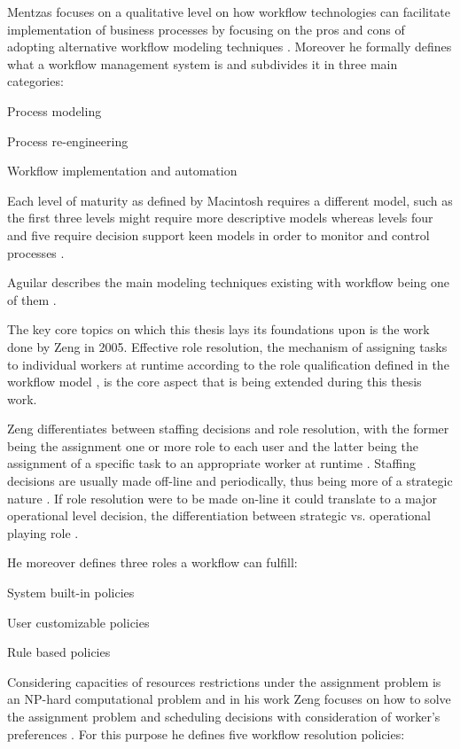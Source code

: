 \documentclass{seal_thesis}
\begin{document}
Mentzas focuses on a qualitative level on how workflow technologies can facilitate implementation of business processes by focusing on the pros and cons of adopting alternative workflow modeling techniques \cite{Mentzas2001}. Moreover he formally defines what a workflow management system is and subdivides it in three main categories:
\begin{enumerate*}
	\item Process modeling
	\item Process re-engineering
	\item Workflow implementation and automation
\end{enumerate*}

Each level of maturity as defined by Macintosh requires a different model, such as the first three levels might require more descriptive models whereas levels four and five require decision support keen models in order to monitor and control processes \cite{Mentzas2001}.

Aguilar describes the main modeling techniques existing with workflow being one of them \cite{Aguilar-Saven2004}.

The key core topics on which this thesis lays its foundations upon is the work done by Zeng in 2005. Effective role resolution, \ie the mechanism of assigning tasks to individual workers at runtime according to the role qualification defined in the workflow model \cite{Zeng2005}, is the core aspect that is being extended during this thesis work.

Zeng differentiates between staffing decisions and role resolution, with the former being the assignment one or more role to each user and the latter being the assignment of a specific task to an appropriate worker at runtime \cite{Zeng2005}. Staffing decisions are usually made off-line and periodically, thus being more of a strategic nature \cite{Zeng2005}. If role resolution were to be made on-line it could translate to a major operational level decision, \ie the differentiation between strategic vs. operational playing role \cite{Zeng2005}.

He moreover defines three roles a workflow can fulfill:
\begin{enumerate*}
	\item System built-in policies
	\item User customizable policies
	\item Rule based policies
\end{enumerate*}

Considering capacities of resources restrictions under the assignment problem is an NP-hard computational problem and in his work Zeng focuses on how to solve the assignment problem and scheduling decisions with consideration of worker's preferences \cite{Zeng2005}. For this purpose he defines five workflow resolution policies:
\end{document}
